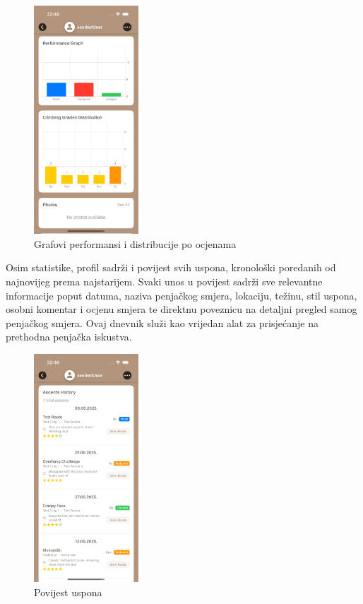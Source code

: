 \begin{figure}[H]
    \centering
    \includegraphics[width=0.35\textwidth]{images/implementacija/user_profile_2.png}
    \caption{Grafovi performansi i distribucije po ocjenama}
    \label{fig:korisnički_profil_2}
\end{figure}

Osim statistike, profil sadrži i povijest svih uspona, kronološki poredanih od najnovijeg prema najstarijem. Svaki unos u povijest sadrži sve relevantne informacije poput datuma, naziva penjačkog smjera, lokaciju, težinu, stil uspona, osobni komentar i ocjenu smjera te direktnu poveznicu na detaljni pregled samog penjačkog smjera. Ovaj dnevnik služi kao vrijedan alat za prisjećanje na prethodna penjačka iskustva.

\begin{figure}[H]
    \centering
    \includegraphics[width=0.35\textwidth]{images/implementacija/user_profile_3.png}
    \caption{Povijest uspona}
    \label{fig:korisnički_profil_3}
\end{figure}



